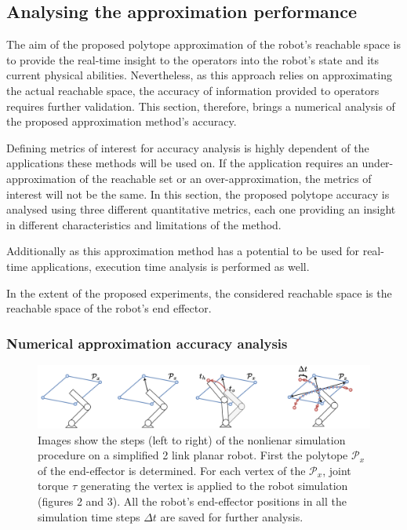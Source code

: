\subsection{Analysing the approximation performance}
\label{ch:analysis}

The aim of the proposed polytope approximation of the robot's reachable space is to provide the real-time insight to the operators into the robot's state and its current physical abilities. 
Nevertheless, as this approach relies on approximating the actual reachable space, 
the accuracy of information provided to operators requires further validation. 
This section, therefore, brings a numerical analysis of the proposed approximation method's accuracy. 

Defining metrics of interest for accuracy analysis is highly dependent of the applications these methods will be used on. If the application requires an under-approximation of the reachable set or an over-approximation, the metrics of interest will not be the same. In this section, the proposed polytope accuracy is analysed using three different quantitative metrics, each one providing an insight in different characteristics and limitations of the method. 

Additionally as this approximation method has a potential to be used for real-time applications, execution time analysis is performed as well. 

In the extent of the proposed experiments, the considered reachable space is the reachable space of the robot's end effector. 

\subsubsection{Numerical approximation accuracy analysis}
\begin{figure}[!t]
    \centering
    \includegraphics[width=\linewidth]{Papers/images/simulation.pdf}
    \caption{Images show the steps (left to right) of the nonlienar simulation procedure on a simplified 2 link planar robot. First the polytope $\mathcal{P}_x$ of the end-effector is determined. For each vertex of the $\mathcal{P}_x$, joint torque $\tau$ generating the vertex is applied to the robot simulation (figures 2 and 3). All the robot's end-effector positions in all the simulation time steps $\Delta t$ are saved for further analysis.}
    \label{fig:simulation}

\end{figure}

